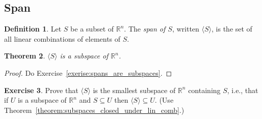 \documentclass{amsart}
\newcommand{\RR}{\mathbb{R}}
\newtheorem{theorem}{Theorem}[section]
\theoremstyle{definition}
\newtheorem{definition}[theorem]{Definition}
\newtheorem{exercise}[theorem]{Exercise}
\begin{document}
\subsection{Span}

\begin{definition}
  Let $S$ be a subset of $\RR^n$. The \emph{span of $S$}, written $\langle S\rangle$, is the set of all linear combinations of elements of $S$.
\end{definition}

\begin{theorem}\label{theorem:spans_are_subspaces}
  $\langle S\rangle$ is a subspace of $\RR^n$.
\end{theorem}

\begin{proof}
  Do Exercise~\ref{exerise:spans_are_subspaces}.
\end{proof}



\begin{exercise}\label{exercise:span_is_smallest}
  Prove that $\langle S\rangle$ is the smallest subspace of $\RR^n$ containing $S$, i.e., that
  if $U$ is a subspace of $\RR^n$ and $S\subseteq U$ then $\langle S\rangle\subseteq U$.
  (Use Theorem~\ref{theorem:subspaces_closed_under_lin_comb}.)
\end{exercise}
\end{document}
